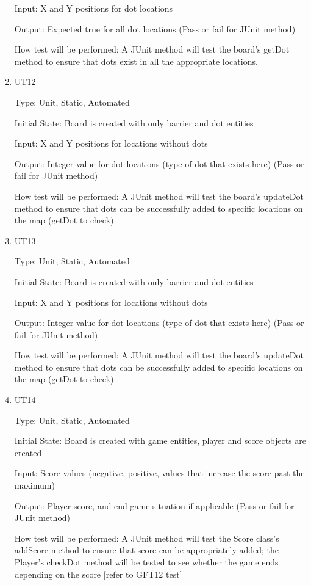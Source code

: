 \documentclass[12pt, titlepage]{article}
\begin{document}
\begin{enumerate}
Input: X and Y positions for dot locations
					
Output: Expected true for all dot locations (Pass or fail for JUnit method)
					
How test will be performed: A JUnit method will test the board's getDot method to ensure that dots exist in all the appropriate locations.

\item{UT12\\}

Type: Unit, Static, Automated
					
Initial State: Board is created with only barrier and dot entities
					
Input: X and Y positions for locations without dots
					
Output: Integer value for dot locations (type of dot that exists here) (Pass or fail for JUnit method)
					
How test will be performed: A JUnit method will test the board's updateDot method to ensure that dots can be successfully added to specific locations on the map (getDot to check).

\item{UT13\\}

Type: Unit, Static, Automated
					
Initial State: Board is created with only barrier and dot entities
					
Input: X and Y positions for locations without dots
					
Output: Integer value for dot locations (type of dot that exists here) (Pass or fail for JUnit method)
					
How test will be performed: A JUnit method will test the board's updateDot method to ensure that dots can be successfully added to specific locations on the map (getDot to check).

\item{UT14\\}

Type: Unit, Static, Automated
					
Initial State: Board is created with game entities, player and score objects are created
					
Input: Score values (negative, positive, values that increase the score past the maximum)
					
Output: Player score, and end game situation if applicable (Pass or fail for JUnit method)
					
How test will be performed: A JUnit method will test the Score class's addScore method to ensure that score can be appropriately added; the Player's checkDot method will be tested to see whether the game ends depending on the score [refer to GFT12 test]

\end{enumerate}
		
\end{document}
